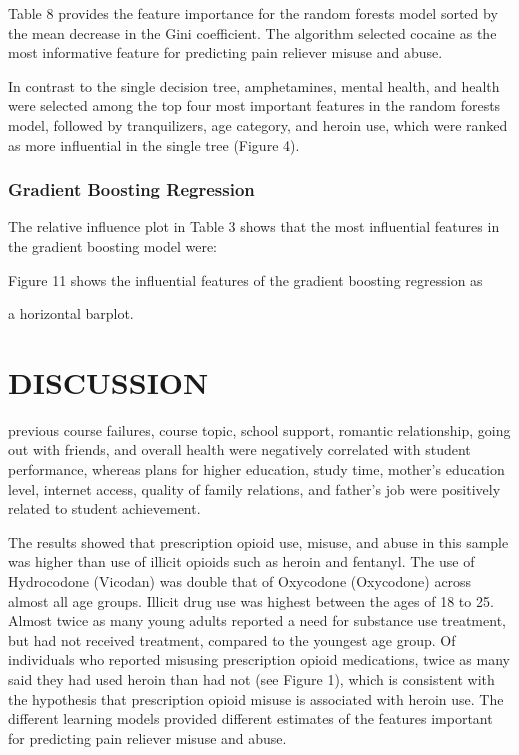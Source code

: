 \documentclass[sigconf]{acmart}
\begin{document}
Table 8 provides the feature importance for 
the random forests model sorted by the mean decrease in the Gini coefficient. 
The algorithm selected cocaine as the most informative feature for predicting 
pain reliever misuse and abuse.

In contrast to the single decision tree, 
amphetamines, mental health, and health were selected among the top four most 
important features in the random forests model, followed by tranquilizers, 
age category, and heroin use, which were ranked as more influential in the 
single tree (Figure 4). 


\subsubsection{Gradient Boosting Regression}

The relative influence plot in Table 3 shows that the most 
influential features in the gradient boosting model were: 

Figure 11 shows the influential features of the gradient boosting regression as 

a horizontal barplot. 


\section{DISCUSSION}

previous course failures, course topic, school support, romantic relationship, 
going out with friends, and overall health were negatively correlated with 
student performance, whereas plans for higher education, study time, mother's
education level, internet access, quality of family relations, and father's 
job were positively related to student achievement.


The results showed that prescription opioid use, misuse, and abuse in this 
sample was higher than use of illicit opioids such as heroin and fentanyl. 
The use of Hydrocodone (Vicodan) was double that of Oxycodone (Oxycodone) 
across almost all age groups. Illicit drug use was highest between the ages 
of 18 to 25. Almost twice as many young adults reported a need for substance 
use treatment, but had not received treatment, compared to the youngest age 
group. Of individuals who reported misusing prescription opioid medications, 
twice as many said they had used heroin than had not (see Figure 1), which is 
consistent with the hypothesis that prescription opioid misuse is associated 
with heroin use. The different learning models provided different estimates 
of the features important for predicting pain reliever misuse and abuse. 
\end{document}
